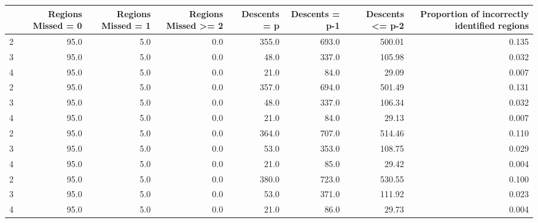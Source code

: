 \begin{tabular}{lrrrrrrr}
\toprule
{} &  Regions Missed = 0 &  Regions Missed = 1 &  Regions Missed >= 2 &  Descents = p &  Descents = p-1 &  Descents <= p-2 &  Proportion of incorrectly identified regions \\
\midrule
2 &                95.0 &                 5.0 &                  0.0 &         355.0 &           693.0 &           500.01 &                                         0.135 \\
3 &                95.0 &                 5.0 &                  0.0 &          48.0 &           337.0 &           105.98 &                                         0.032 \\
4 &                95.0 &                 5.0 &                  0.0 &          21.0 &            84.0 &            29.09 &                                         0.007 \\
2 &                95.0 &                 5.0 &                  0.0 &         357.0 &           694.0 &           501.49 &                                         0.131 \\
3 &                95.0 &                 5.0 &                  0.0 &          48.0 &           337.0 &           106.34 &                                         0.032 \\
4 &                95.0 &                 5.0 &                  0.0 &          21.0 &            84.0 &            29.13 &                                         0.007 \\
2 &                95.0 &                 5.0 &                  0.0 &         364.0 &           707.0 &           514.46 &                                         0.110 \\
3 &                95.0 &                 5.0 &                  0.0 &          53.0 &           353.0 &           108.75 &                                         0.029 \\
4 &                95.0 &                 5.0 &                  0.0 &          21.0 &            85.0 &            29.42 &                                         0.004 \\
2 &                95.0 &                 5.0 &                  0.0 &         380.0 &           723.0 &           530.55 &                                         0.100 \\
3 &                95.0 &                 5.0 &                  0.0 &          53.0 &           371.0 &           111.92 &                                         0.023 \\
4 &                95.0 &                 5.0 &                  0.0 &          21.0 &            86.0 &            29.73 &                                         0.004 \\
\bottomrule
\end{tabular}
